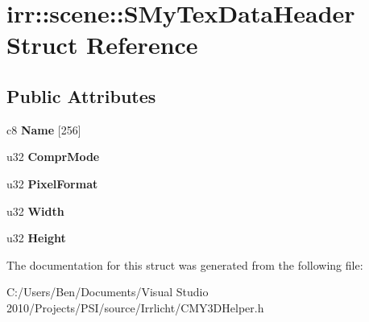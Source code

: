 \hypertarget{structirr_1_1scene_1_1_s_my_tex_data_header}{\section{irr\-:\-:scene\-:\-:S\-My\-Tex\-Data\-Header Struct Reference}
\label{structirr_1_1scene_1_1_s_my_tex_data_header}
}
\subsection*{Public Attributes}
\begin{DoxyCompactItemize}
\item 
\hypertarget{structirr_1_1scene_1_1_s_my_tex_data_header_a04d1317ffdce6eeda952a2e62e07b008}{c8 {\bfseries Name} \mbox{[}256\mbox{]}}\label{structirr_1_1scene_1_1_s_my_tex_data_header_a04d1317ffdce6eeda952a2e62e07b008}

\item 
\hypertarget{structirr_1_1scene_1_1_s_my_tex_data_header_a2a5490b614b13f8d7088b6ddd4a6239f}{u32 {\bfseries Compr\-Mode}}\label{structirr_1_1scene_1_1_s_my_tex_data_header_a2a5490b614b13f8d7088b6ddd4a6239f}

\item 
\hypertarget{structirr_1_1scene_1_1_s_my_tex_data_header_a5259f0b1ae12fbfd1aa5b02ba8ab20b6}{u32 {\bfseries Pixel\-Format}}\label{structirr_1_1scene_1_1_s_my_tex_data_header_a5259f0b1ae12fbfd1aa5b02ba8ab20b6}

\item 
\hypertarget{structirr_1_1scene_1_1_s_my_tex_data_header_a6558d4d6af49d5a61e6b16783101dfd5}{u32 {\bfseries Width}}\label{structirr_1_1scene_1_1_s_my_tex_data_header_a6558d4d6af49d5a61e6b16783101dfd5}

\item 
\hypertarget{structirr_1_1scene_1_1_s_my_tex_data_header_a0b7bce1a9edaac529766849ae624f83a}{u32 {\bfseries Height}}\label{structirr_1_1scene_1_1_s_my_tex_data_header_a0b7bce1a9edaac529766849ae624f83a}

\end{DoxyCompactItemize}


The documentation for this struct was generated from the following file\-:\begin{DoxyCompactItemize}
\item 
C\-:/\-Users/\-Ben/\-Documents/\-Visual Studio 2010/\-Projects/\-P\-S\-I/source/\-Irrlicht/C\-M\-Y3\-D\-Helper.\-h\end{DoxyCompactItemize}
